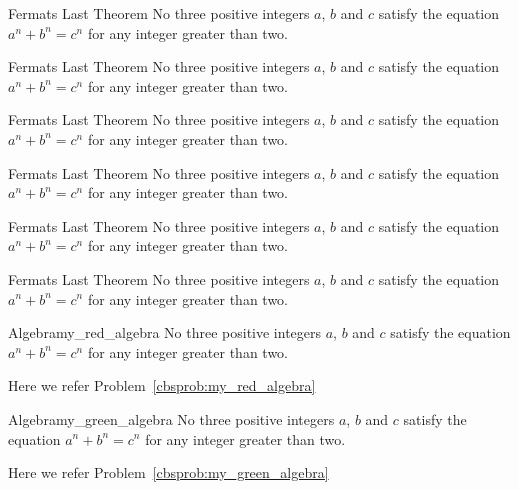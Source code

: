 \documentclass[11pt, letterpaper]{../src/exercise}
\begin{document}
    \begin{cbred}{Fermats Last Theorem}
    No three positive integers \(a\), \(b\) and \(c\) satisfy the equation
    \(a^{n} + b^{n} = c^{n}\) for any integer greater than two.
    \end{cbred}

    \begin{cbgreen}{Fermats Last Theorem}
    No three positive integers \(a\), \(b\) and \(c\) satisfy the equation
    \(a^{n} + b^{n} = c^{n}\) for any integer greater than two.
    \end{cbgreen}

    \begin{cbblue}{Fermats Last Theorem}
    No three positive integers \(a\), \(b\) and \(c\) satisfy the equation
    \(a^{n} + b^{n} = c^{n}\) for any integer greater than two.
    \end{cbblue}

    \begin{cbhoney}{Fermats Last Theorem}
    No three positive integers \(a\), \(b\) and \(c\) satisfy the equation
    \(a^{n} + b^{n} = c^{n}\) for any integer greater than two.
    \end{cbhoney}

    \begin{cbpink}{Fermats Last Theorem}
    No three positive integers \(a\), \(b\) and \(c\) satisfy the equation
    \(a^{n} + b^{n} = c^{n}\) for any integer greater than two.
    \end{cbpink}

    \begin{cbpurple}{Fermats Last Theorem}
    No three positive integers \(a\), \(b\) and \(c\) satisfy the equation
    \(a^{n} + b^{n} = c^{n}\) for any integer greater than two.
    \end{cbpurple}

    \begin{cbredproblem}{Algebra}{my_red_algebra}
    No three positive integers \(a\), \(b\) and \(c\) satisfy the equation
    \(a^{n} + b^{n} = c^{n}\) for any integer greater than two.
    \end{cbredproblem}
    Here we refer Problem~\ref{cbsprob:my_red_algebra}%

    \begin{cbgreenproblem}{Algebra}{my_green_algebra}
    No three positive integers \(a\), \(b\) and \(c\) satisfy the equation
    \(a^{n} + b^{n} = c^{n}\) for any integer greater than two.
    \end{cbgreenproblem}
    Here we refer Problem~\ref{cbsprob:my_green_algebra}%
\end{document}
